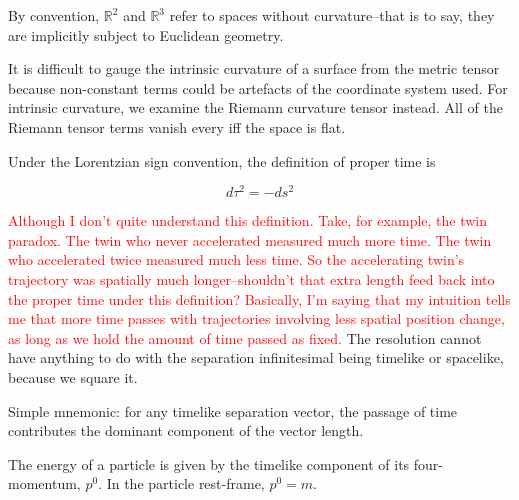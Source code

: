 \documentclass[11pt]{article}
\begin{document}
By convention, $\mathbb{R}^2$ and $\mathbb{R}^3$ refer to spaces without
curvature--that is to say, they are implicitly subject to Euclidean geometry.

It is difficult to gauge the intrinsic curvature of a surface from the metric
tensor because non-constant terms could be artefacts of the coordinate system
used. For intrinsic curvature, we examine the Riemann curvature tensor instead.
All of the Riemann tensor terms vanish every iff the space is flat.

Under the Lorentzian sign convention, the definition of proper time is

\begin{equation}
	d\tau^2 = -ds^2
\end{equation}

\textcolor{red}{Although I don't quite understand this definition. Take, for
example, the twin paradox. The twin who never accelerated measured much more
time. The twin who accelerated twice measured much less time. So the
accelerating twin's trajectory was spatially much longer--shouldn't that extra
length feed back into the proper time under this definition? Basically, I'm
saying that my intuition tells me that more time passes with trajectories
involving less spatial position change, as long as we hold the amount of time
passed as fixed.} The resolution cannot have anything to do with the separation
infinitesimal being timelike or spacelike, because we square it.

Simple mnemonic: for any timelike separation vector, the passage of time
contributes the dominant component of the vector length.

The energy of a particle is given by the timelike component of its
four-momentum, $p^0$. In the particle rest-frame, $p^0 = m$.
\end{document}
